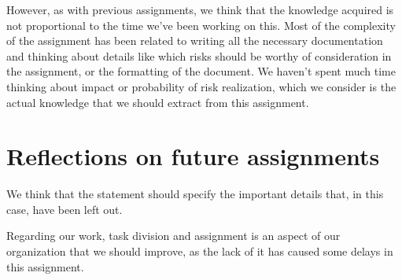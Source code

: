 However, as with previous assignments, we think that the knowledge acquired is not proportional to the time we've been working on this. Most of the complexity of the assignment has been related to writing all the necessary documentation and thinking about details like which risks should be worthy of consideration in the assignment, or the formatting of the document. We haven't spent much time thinking about impact or probability of risk realization, which we consider is the actual knowledge that we should extract from this assignment.

\section{Reflections on future assignments}

We think that the statement should specify the important details that, in this case, have been left out.

Regarding our work, task division and assignment is an aspect of our organization that we should improve, as the lack of it has caused some delays in this assignment.
